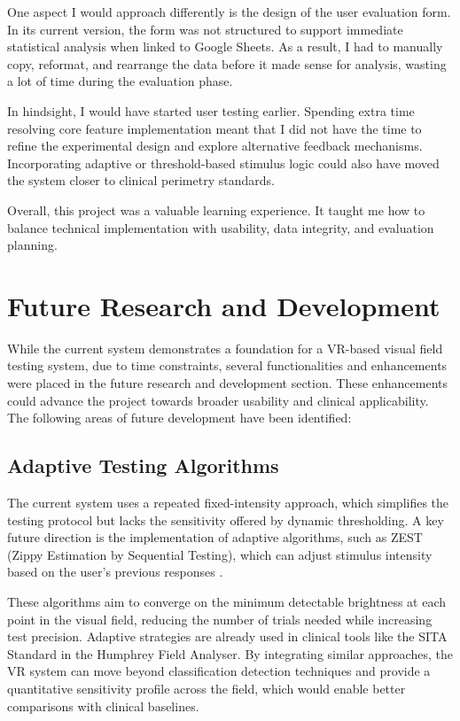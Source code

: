 \documentclass{l4proj}
\begin{document}
One aspect I would approach differently is the design of the user evaluation form. In its current version, the form was not structured to support immediate statistical analysis when linked to Google Sheets. As a result, I had to manually copy, reformat, and rearrange the data before it made sense for analysis, wasting a lot of time during the evaluation phase.

In hindsight, I would have started user testing earlier. Spending extra time resolving core feature implementation meant that I did not have the time to refine the experimental design and explore alternative feedback mechanisms. Incorporating adaptive or threshold-based stimulus logic could also have moved the system closer to clinical perimetry standards.

Overall, this project was a valuable learning experience.  It taught me how to balance technical implementation with usability, data integrity, and evaluation planning.

\section{Future Research and Development}
While the current system demonstrates a foundation for a VR-based visual field testing system, due to time constraints, several functionalities and enhancements were placed in the future research and development section. These enhancements could advance the project towards broader usability and clinical applicability. The following areas of future development have been identified:

\subsection{Adaptive Testing Algorithms}
The current system uses a repeated fixed-intensity approach, which simplifies the testing protocol but lacks the sensitivity offered by dynamic thresholding. A key future direction is the implementation of adaptive algorithms, such as ZEST (Zippy Estimation by Sequential Testing), which can adjust stimulus intensity based on the user’s previous responses \citep{conclua}.

These algorithms aim to converge on the minimum detectable brightness at each point in the visual field, reducing the number of trials needed while increasing test precision. Adaptive strategies are already used in clinical tools like the SITA Standard in the Humphrey Field Analyser. By integrating similar approaches, the VR system can move beyond classification detection techniques and provide a quantitative sensitivity profile across the field, which would enable better comparisons with clinical baselines.
\end{document}
